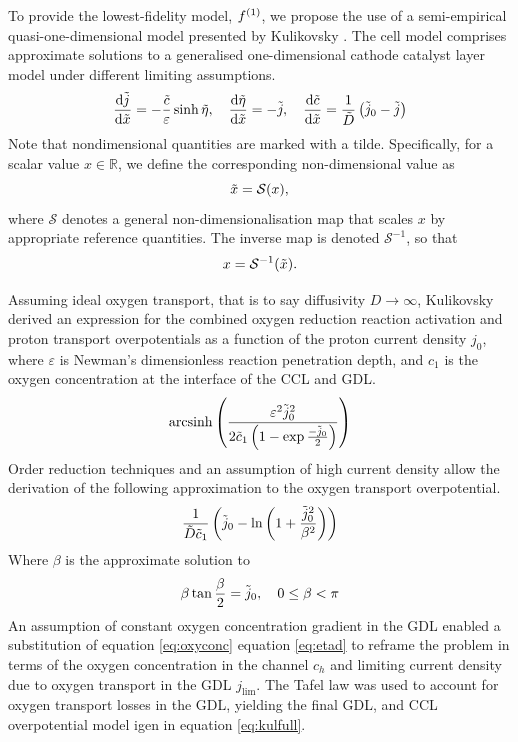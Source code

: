 To provide the lowest-fidelity model, $f^{(1)}$, we propose the use of a semi-empirical quasi-one-dimensional model presented by Kulikovsky \cite{kulikovskyPhysicallyBasedAnalytical2013a}.
The cell model comprises approximate solutions to a generalised one-dimensional cathode catalyst layer model under different limiting assumptions.
\begin{equation}
	\frac{\text{d} \tilde{j}}{\text{d} \tilde{x}}      = -\frac{\tilde{c}}{\varepsilon}\sinh{\tilde{\eta}}, \quad
	\frac{\text{d} \tilde{\eta}}{\text{d} \tilde{x}}  = -\tilde{j}, \quad
	\frac{\text{d} \tilde{c}}{\text{d} \tilde{x}}      = \frac{1}{\tilde{D}}\left(\tilde{j}_0 - \tilde{j}\right)
\end{equation}
Note that nondimensional quantities are marked with a tilde. Specifically, for a scalar value \( x \in \mathbb{R} \), we define the corresponding non-dimensional value as
\[
	\tilde{x} = \mathcal{S}(x),
\]
where \( \mathcal{S} \) denotes a general non-dimensionalisation map that scales \( x \) by appropriate reference quantities. The inverse map is denoted \( \mathcal{S}^{-1} \), so that
\[
	x = \mathcal{S}^{-1}(\tilde{x}).
\]

Assuming ideal oxygen transport, that is to say diffusivity $D \rightarrow \infty$, Kulikovsky derived an expression for the combined oxygen reduction reaction activation and proton transport overpotentials as a function of the proton current density $j_0$, where $\varepsilon$ is Newman's dimensionless reaction penetration depth, and $c_1$ is the oxygen concentration at the interface of the CCL and GDL.
\begin{equation}
	\text{arcsinh}\left(\frac{\varepsilon^2 \tilde{j}_0^2}{2 \tilde{c}_1 \left(1 - \exp{\frac{-\tilde{j}_0}{2}}\right)}\right) \label{eq:eta}
\end{equation}
Order reduction techniques and an assumption of high current density allow the derivation of the following approximation to the oxygen transport overpotential.
\begin{equation}
	\frac{1}{\tilde{D}\tilde{c}_1}\left(\tilde{j}_0 - \ln\left(1 + \frac{\tilde{j}_0^2}{\beta^2}\right)\right) \label{eq:etad}
\end{equation}
Where $\beta$ is the approximate solution to
\begin{equation}
	\beta \tan{\frac{\beta}{2}} = \tilde{j}_0, \quad 0 \le \beta < \pi
\end{equation}
An assumption of constant oxygen concentration gradient in the GDL enabled a substitution of equation \ref{eq:oxyconc} equation \ref{eq:etad} to reframe the problem in terms of the oxygen concentration in the channel $c_h$ and limiting current density due to oxygen transport in the GDL $j_{\text{lim}}$. The Tafel law was used to account for oxygen transport losses in the GDL, yielding the final GDL, and CCL overpotential model igen in equation \ref{eq:kulfull}.

